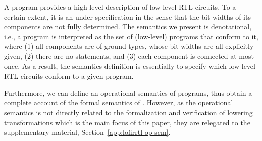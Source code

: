 


A {\hifirrtl} program provides a high-level description of low-level RTL circuits. To a certain extent, it is %
an under-specification in the sense that the bit-widths of its components are not fully determined.
The semantics we present is denotational, i.e., a {\hifirrtl} program
is interpreted as the set of (low-level) {\lofirrtl} programs that conform to it, where (1) all components are of ground types,
whose bit-widths are all explicitly given, (2) there are no  statements, and (3) each component is connected at most once.
As a result, the semantics definition is essentially to specify which low-level RTL circuits conform to a given {\hifirrtl} program.

Furthermore, we can define an operational semantics of {\lofirrtl} programs, thus obtain a complete account of the formal semantics of {\firrtl}. However, as the operational semantics is not directly related to the formalization and verification of lowering transformations which is the main focus of this paper, they are relegated to the supplementary material, Section~\ref{app:lofirrtl-op-sem}. 

